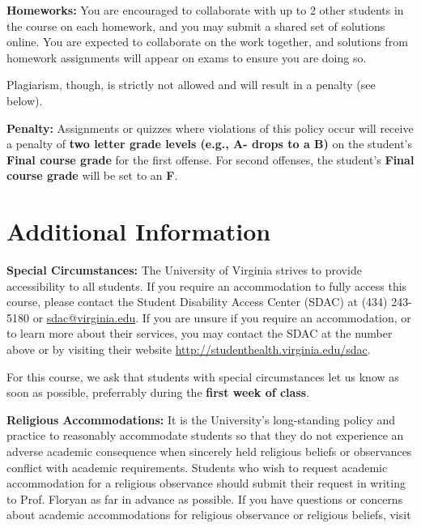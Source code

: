 \documentclass[12pt]{article}
\begin{document}
\textbf{Homeworks:} You are encouraged to collaborate with up to 2 other students in the course on each homework, and you may submit a shared set of solutions online. You are expected to collaborate on the work together, and solutions from homework assignments will appear on exams to ensure you are doing so.

Plagiarism, though, is strictly not allowed and will result in a penalty (see below).

\textbf{Penalty:} Assignments or quizzes where violations of this policy occur will receive a penalty of \textbf{two letter grade levels (e.g., A- drops to a B)} on the student's \textbf{Final course grade} for the first offense. For second offenses, the student's \textbf{Final course grade} will be set to an \textbf{F}.

\section*{Additional Information}


\textbf{Special Circumstances:} The University of Virginia strives to provide accessibility to all students. If you require an accommodation to fully access this course, please contact the Student Disability Access Center (SDAC) at (434) 243-5180 or \url{sdac@virginia.edu}. If you are unsure if you require an accommodation, or to learn more about their services, you may contact the SDAC at the number above or by visiting their website \url{http://studenthealth.virginia.edu/sdac}.

For this course, we ask that students with special circumstances let us know as soon as possible, preferrably during the \textbf{first week of class}.

\textbf{Religious Accommodations:} It is the University's long-standing policy and practice to reasonably accommodate students so that they do not experience an adverse academic consequence when sincerely held religious beliefs or observances conflict with academic requirements.  Students who wish to request academic accommodation for a religious observance should submit their request in writing to Prof. Floryan as far in advance as possible. If you have questions or concerns about academic accommodations for religious observance or religious beliefs, visit 
\end{document}
